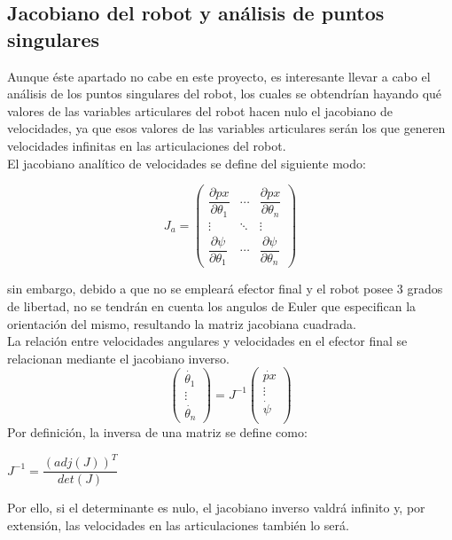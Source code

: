 	\subsection{Jacobiano del robot y análisis de puntos singulares}
Aunque éste apartado no cabe en este proyecto, es interesante llevar a cabo el análisis de los puntos singulares del robot, los cuales se obtendrían hayando qué valores de las variables articulares del robot hacen nulo el jacobiano de velocidades, ya que esos valores de las variables articulares serán los que generen velocidades infinitas en las articulaciones del robot.\\
El jacobiano analítico de velocidades se define del siguiente modo:

\begin{equation}
	J_{a} =
	\begin{pmatrix}
	\dfrac{\partial px}{\partial \theta_{1}} & \cdots & \dfrac{\partial px}{\partial \theta_{n}} \\
	\vdots  & \ddots & \vdots  \\
	\dfrac{\partial \psi}{\partial \theta_{1}} & \cdots & \dfrac{\partial \psi}{\partial \theta_{n}}
	\end{pmatrix}
\end{equation}

sin embargo, debido a que no se empleará efector final y el robot posee 3 grados de libertad, no se tendrán en cuenta los angulos de Euler que especifican la orientación del mismo, resultando la matriz jacobiana cuadrada.\\

\newpage
La relación entre velocidades angulares y velocidades en el efector final se relacionan mediante el jacobiano inverso.
\begin{equation}
\begin{pmatrix}
\dot{\theta_{1}} \\
\vdots  \\
\dot{\theta_{n}}
\end{pmatrix}
= J^{-1}
\begin{pmatrix}
\dot{px} \\
\vdots  \\
\dot{\psi} \\
\end{pmatrix}
\end{equation}
Por definición, la inversa de una matriz se define como:\\
\begin{center}
	$ J^{-1}=\dfrac{(adj(J))^{T}}{det(J)}$
\end{center}
Por ello, si el determinante es nulo, el jacobiano inverso valdrá infinito y, por extensión, las velocidades en las articulaciones también lo será.\\
